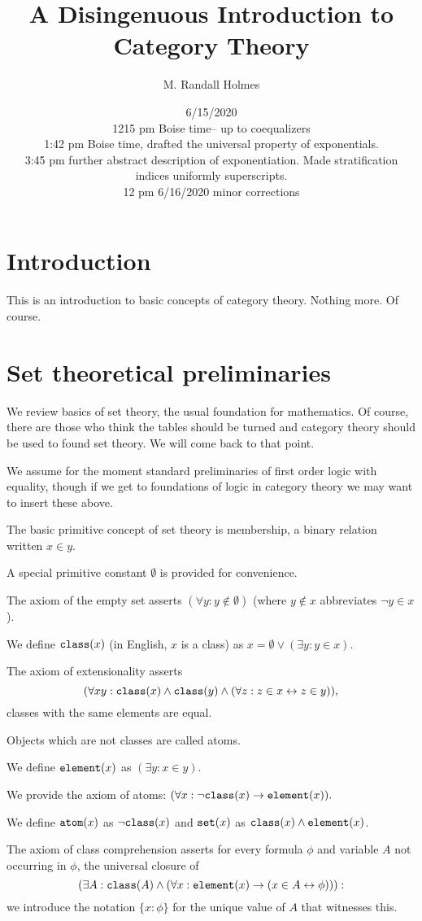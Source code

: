 \documentclass[12pt]{article}
\title{A Disingenuous Introduction to Category Theory}
\author{M. Randall Holmes}
\date{6/15/2020 \\ 1215 pm Boise time-- up to coequalizers \\ 1:42 pm Boise time, drafted the universal property of exponentials. \\ 3:45 pm further abstract description of exponentiation.  Made stratification indices uniformly superscripts.\\ 12 pm 6/16/2020 minor corrections}
\begin{document}
\maketitle

\section{Introduction}

This is an introduction to basic concepts of category theory.  Nothing more.  Of course.

\section{Set theoretical preliminaries}

We review basics of set theory, the usual foundation for mathematics.  Of course, there are those who think the tables should be turned and category theory should be used to found set theory.  We will come back to that point.

We assume for the moment standard preliminaries of first order logic with equality, though if we get to foundations of logic in category theory we may want to insert these above.

The basic primitive concept of set theory is membership, a binary relation written $x \in y$.

A special primitive constant $\emptyset$ is provided for convenience.  

The axiom of the empty set asserts $(\forall y: y \not\in \emptyset)$ (where $y \not\in x$ abbreviates $\neg y \in x$).

We define ${\tt class}(x)$ (in English, $x$ is a class) as $x = \emptyset \vee (\exists y: y \in x)$.

The axiom of extensionality asserts $$(\forall xy: {\tt class}(x) \wedge {\tt class}(y)  \wedge (\forall z:z \in x \leftrightarrow z \in y)),$$ classes with the same elements are equal.

Objects which are not classes are called atoms.

We define ${\tt element}(x)$ as $(\exists y:x \in y)$. 

We provide the axiom of atoms:  $(\forall x:\neg{\tt class}(x) \rightarrow {\tt element}(x)).$

We define ${\tt atom}(x)$ as $\neg{\tt class}(x)$ and ${\tt set}(x)$ as ${\tt class}(x) \wedge {\tt element}(x)$.

The axiom of class comprehension asserts for every formula $\phi$ and variable $A$ not occurring in $\phi$, the universal closure of $$(\exists A: {\tt class}(A) \wedge  (\forall x: {\tt element}(x) \rightarrow (x \in A \leftrightarrow \phi))):$$  we introduce the notation $\{x : \phi\}$ for the unique value of $A$ that witnesses this.
\end{document}
